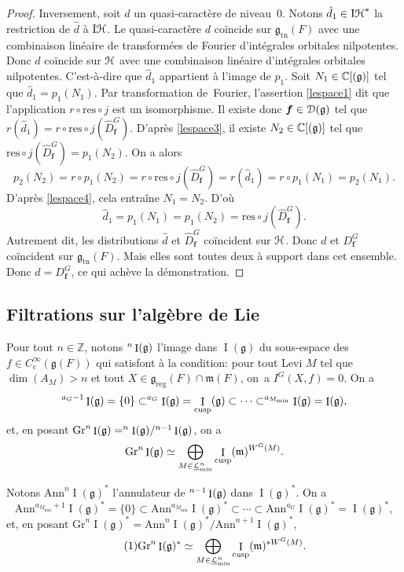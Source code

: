 \documentclass[11pt]{article}
\numberwithin{equation}{section}\providecommand{\og}{«\,}\providecommand{\fg}{\,»}
\let\mathcal \EuScript
\newcommand{\NoChangel}[1]{%
\expandafter\let\csname old\string#1\endcsname=#1
\let#1=\relax
\newcommand{#1}{\mathcode`l="716C\csname old\string#1\endcsname\mathcode`l="7160 }%
}
\newcommand{\frg}{\mathfrak{g}}
\newcommand{\mfrm}{\mathfrak{m}}
\newcommand{\Ann}{\mathrm{Ann}}
\newcommand{\rc}{\mathrm{c}}
\newcommand{\cusp}{\mathrm{cusp}}
\newcommand{\Fil}{\mathrm{Fil}} \NoChangel{\Fil}
\newcommand{\Gr}{\mathrm{Gr}}
\newcommand{\Nil}{\mathrm{Nil}} \NoChangel{\Nil}
\newcommand{\reg}{\mathrm{reg}}
\newcommand{\res}{\mathrm{res}}
\newcommand{\tn}{\mathrm{tn}}
\DeclareMathOperator{\rI}{I}
\DeclareMathOperator{\rIH}{I\cH}
\newcommand{\bmf}{\boldsymbol{f}}
\newcommand{\cD}{\mathcal{D}}
\newcommand{\cH}{\mathcal{H}}
\newcommand{\cL}{\mathcal{L}}
\newcommand{\CC}{\mathbb{C}}
\newcommand{\ZZ}{\mathbb{Z}}
\theoremstyle{plain}
\theoremstyle{definition}
\begin{document}
\begin{proof}
Inversement, soit $d$ un quasi-caractère de niveau~$0$. Notons $\hat{d}_{1}\in \rIH^*$ la restriction de $\hat{d}$ à $\rIH$. Le quasi-caractère $d$ coïncide sur $\frg_{\tn}(F)$ avec une combinaison linéaire de transformées de Fourier d'intégrales orbitales nilpotentes. Donc $\hat{d}$ coïncide sur $\cH$ avec une combinaison linéaire d'intégrales orbitales nilpotentes. C'est-à-dire que $\hat{d}_{1}$ appartient à l'image de $p_{1}$. Soit $N_{1}\in \CC[\Nil(\frg)]$ tel que $\hat{d}_{1}=p_{1}(N_{1})$. Par transformation de~Fourier, l'assertion \eqref{lespace1} dit que l'application $r\circ \res\circ j$ est un isomorphisme. Il existe donc $\bmf\in \cD(\frg)$ tel que $r(\hat{d}_{1})=r\circ \res\circ j(\hat{D}^G_{\bmf})$. D'après \eqref{lespace3}, il existe $N_{2}\in \CC[\Nil(\frg)]$ tel que $\res\circ j(\hat{D}^G_{\bmf})=p_{1}(N_{2})$. On a alors
\[
p_{2}(N_{2})=r\circ p_{1}(N_{2})=r\circ \res\circ j(\hat{D}^G_{\bmf})=r(\hat{d}_{1})=r\circ p_{1}(N_{1})=p_{2}(N_{1}).
\]
D'après \eqref{lespace4}, cela entraîne $N_{1}=N_{2}$. D'où
\[
\hat{d}_{1}=p_{1}(N_{1})=p_{1}(N_{2})=\res\circ j(\hat{D}^G_{\bmf}).
\]
Autrement dit, les distributions $\hat{d}$ et $\hat{D}^G_{\bmf}$ coïncident sur $\cH$. Donc $d$ et $D^G_{\bmf}$ coïncident sur $\frg_{\tn}(F)$. Mais elles sont toutes deux à support dans cet ensemble. Donc $d=D^G_{\bmf}$, ce qui achève la démonstration.
\end{proof}

\subsection{Filtrations sur l'algèbre de Lie}\label{filtrationssurlalgebredelie}
Pour tout $n \in \ZZ$, notons $\Fil^n\rI(\frg)$ l'image dans $\rI(\frg)$ du sous-espace des $f\in C_{\rc}^{\infty}(\frg(F))$ qui satisfont à la condition: pour tout Levi $M$ tel que $\dim(A_{M})>n$ et tout $X\in \frg_{\reg}(F)\cap \mfrm(F)$, on~a $I^G(X,f)=0$. On a
\[
\Fil^{a_{G}-1}\rI(\frg)=\{0\}\subset \Fil^{a_{G}}\rI(\frg)=\rI_{\cusp}(\frg)\subset\cdots\subset \Fil^{a_{M_{\min}}}\rI(\frg)=\rI(\frg),
\]
et, en posant $\Gr^n\rI(\frg)=\Fil^n\rI(\frg)/\Fil^{n-1}\rI(\frg)$, on a
\[
\Gr^n\rI(\frg)\simeq \bigoplus_{M\in \underline{\cL}_{\min}^n}\rI_{\cusp}(\mfrm)^{W^G(M)}.
\]

Notons $\Ann^n\rI(\frg)^*$ l'annulateur de $\Fil^{n-1}\rI(\frg)$ dans $\rI(\frg)^*$. On a
\[
\Ann^{a_{M_{\min}}+1}\rI(\frg)^*=\{0\}\subset \Ann^{a_{M_{\min}}}\rI(\frg)^*\subset\cdots\subset \Ann^{a_{G}}\rI(\frg)^*=\rI(\frg)^*,
\]
et, en posant $\Gr^n\rI(\frg)^*=\Ann^n\rI(\frg)^*/\Ann^{n+1}\rI(\frg)^*$,
\begin{equation}\tag{1}\label{filtrationssurlalgebredelie1}
\Gr^n\rI(\frg)^*\simeq \bigoplus_{M\in \underline{\cL}_{\min}^n}\rI_{\cusp}(\mfrm)^{*W^G(M)}.
\end{equation}
\end{document}
